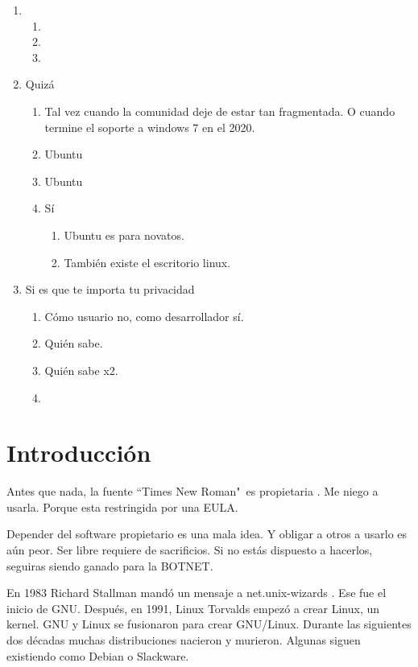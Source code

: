 \documentclass[12pt, twoside]{article}
\begin{document}
\begin{enumerate}
	\item
		\begin{enumerate}
			\item
			\item
			\item
		\end{enumerate}
	\item Quizá
		\begin{enumerate}
			\item Tal vez cuando la comunidad deje de estar tan fragmentada.
				O cuando termine el soporte a windows 7 en el 2020.
			\item Ubuntu
			\item Ubuntu
			\item Sí
				\begin{enumerate}
					\item Ubuntu es para novatos.
					\item También existe el escritorio linux.
				\end{enumerate}
		\end{enumerate}
	\item Si es que te importa tu privacidad
		\begin{enumerate}
			\item Cómo usuario no, como desarrollador sí.
			\item Quién sabe.
			\item Quién sabe x2.
			\item
		\end{enumerate}
\end{enumerate}

\fi
\section{Introducción}%
\label{sec:Introducción}

Antes que nada, la fuente ``Times New Roman"\ es propietaria \citet{NEWROMAN}.
Me niego a usarla.
Porque esta restringida por una EULA.

Depender del software propietario es una mala idea.
Y obligar a otros a usarlo es aún peor.
Ser libre requiere de sacrificios.
Si no estás dispuesto a hacerlos, seguiras siendo ganado para la BOTNET.

%
En 1983 Richard Stallman mandó un mensaje a net.unix-wizards \citet[89]{faif}.
Ese fue el inicio de GNU.
Después, en 1991, Linux Torvalds empezó a crear Linux, un kernel.
GNU y Linux se fusionaron para crear GNU/Linux.
Durante las siguientes dos décadas muchas distribuciones nacieron y murieron.
Algunas siguen existiendo como Debian o Slackware. \citet{DISTROS}
\end{document}

